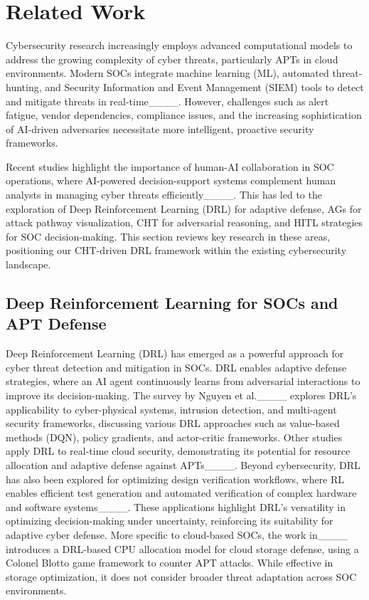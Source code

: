 \section{Related Work}
Cybersecurity research increasingly employs advanced computational models to address the growing complexity of cyber threats, particularly APTs in cloud environments. Modern SOCs integrate machine learning (ML), automated threat-hunting, and Security Information and Event Management (SIEM) tools to detect and mitigate threats in real-time____. However, challenges such as alert fatigue, vendor dependencies, compliance issues, and the increasing sophistication of AI-driven adversaries necessitate more intelligent, proactive security frameworks.

Recent studies highlight the importance of human-AI collaboration in SOC operations, where AI-powered decision-support systems complement human analysts in managing cyber threats efficiently____. This has led to the exploration of Deep Reinforcement Learning (DRL) for adaptive defense, AGs for attack pathway visualization, CHT for adversarial reasoning, and HITL strategies for SOC decision-making. This section reviews key research in these areas, positioning our CHT-driven DRL framework within the existing cybersecurity landscape.

\subsection{Deep Reinforcement Learning for SOCs and APT Defense}
Deep Reinforcement Learning (DRL) has emerged as a powerful approach for cyber threat detection and mitigation in SOCs. DRL enables adaptive defense strategies, where an AI agent continuously learns from adversarial interactions to improve its decision-making.
The survey by Nguyen et al.____ explores DRL’s applicability to cyber-physical systems, intrusion detection, and multi-agent security frameworks, discussing various DRL approaches such as value-based methods (DQN), policy gradients, and actor-critic frameworks. Other studies apply DRL to real-time cloud security, demonstrating its potential for resource allocation and adaptive defense against APTs____. Beyond cybersecurity, DRL has also been explored for optimizing design verification workflows, where RL enables efficient test generation and automated verification of complex hardware and software systems____. These applications highlight DRL’s versatility in optimizing decision-making under uncertainty, reinforcing its suitability for adaptive cyber defense.
More specific to cloud-based SOCs, the work in____ introduces a DRL-based CPU allocation model for cloud storage defense, using a Colonel Blotto game framework to counter APT attacks. While effective in storage optimization, it does not consider broader threat adaptation across SOC environments.


